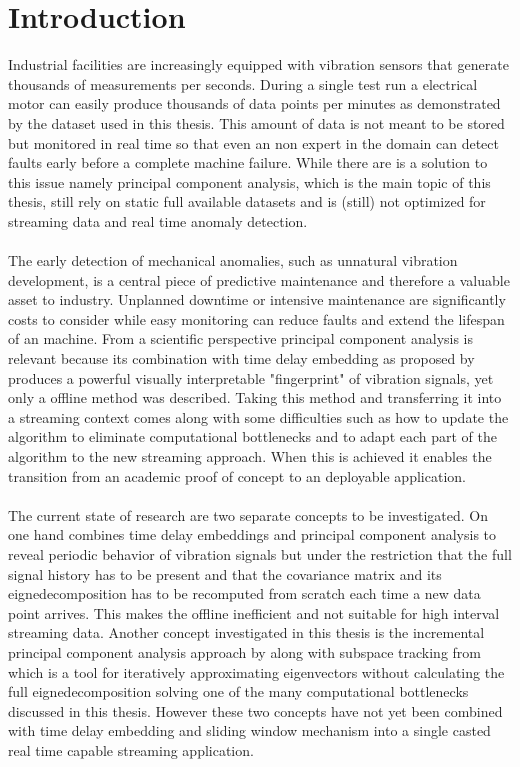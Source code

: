 \chapter{Introduction}
Industrial facilities are increasingly equipped with vibration sensors that generate thousands of measurements per seconds. During a single test run a electrical motor can easily produce thousands of data points per minutes as demonstrated by the dataset used in this thesis. This amount of data is not meant to be stored but monitored in real time so that even an non expert in the domain can detect faults early before a complete machine failure. While there are is a solution to this issue namely principal component analysis, which is the main topic of this thesis, still rely on static full available datasets and is (still) not optimized for streaming data and real time anomaly detection. \\\\
The early detection of mechanical anomalies, such as unnatural vibration development, is a central piece of predictive maintenance and therefore a valuable asset to industry. Unplanned downtime or intensive maintenance are significantly costs to consider while easy monitoring can reduce faults and extend the lifespan of an machine. From a scientific perspective principal component analysis is relevant because its combination with time delay embedding as proposed by \textcite{rakuschek2025visual} produces a powerful visually interpretable "fingerprint" of vibration signals, yet only a offline method was described. Taking this method and transferring it into a streaming context comes along with some difficulties such as how to update the algorithm to eliminate computational bottlenecks and to adapt each part of the algorithm to the new streaming approach. When this is achieved it enables the transition from an academic proof of concept to an deployable application.\\ \\
The current state of research are two separate concepts to be investigated. On one hand \textcite{rakuschek2025visual} combines time delay embeddings and principal component analysis to reveal periodic behavior of vibration signals but under the restriction that the full signal history has to be present and that the covariance matrix and its eignedecomposition has to be recomputed from scratch each time a new data point arrives. This makes the offline inefficient and not suitable for high interval streaming data. Another concept investigated in this thesis is the incremental principal component analysis approach by \textcite{Incremental_PCA} along with subspace tracking from \textcite{Oja1982SimplifiedNM} which is a tool for iteratively approximating eigenvectors without calculating the full eignedecomposition solving one of the many computational bottlenecks discussed in this thesis. However these two concepts have not yet been combined with time delay embedding and sliding window mechanism into a single casted real time capable streaming application.\\ \\
